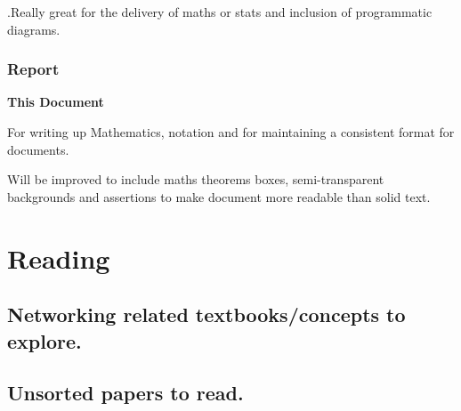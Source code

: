 \documentclass[]{scrreprt}
\begin{document}
.Really great for the delivery of maths or stats and inclusion of programmatic diagrams.

\subsection{Report}
\textbf{This Document}

For writing up Mathematics, notation and for maintaining a consistent format for documents.

Will be improved to include maths theorems boxes, semi-transparent backgrounds and assertions to make document more readable than solid text.

\chapter{Reading}
\section{Networking related textbooks/concepts to explore.}
\section{Unsorted papers to read.}
\end{document}
